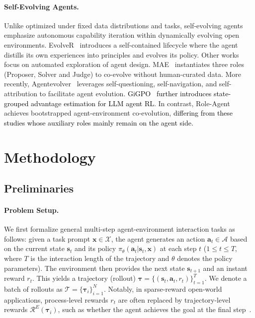 \documentclass[11pt]{article}
\begin{document}
\paragraph{Self-Evolving Agents.} Unlike optimized under fixed data distributions and tasks, self-evolving agents~\cite{gao2025survey,zhai2025agentevolver} emphasize autonomous capability iteration within dynamically evolving open environments. EvolveR~\cite{wu2025evolver} introduces a self-contained lifecycle where the agent distills its own experiences into principles and evolves its policy. Other works~\cite{hu2024automated,novikov2025alphaevolve} focus on automated exploration of agent design. MAE~\cite{chen2025multi} instantiates three roles (Proposer, Solver and Judge) to co-evolve without human-curated data. More recently, Agentevolver~\cite{zhai2025agentevolver} leverages self-questioning, self-navigation, and self-attribution to facilitate agent evolution. \textcolor{black}{GiGPO~\cite{feng2025group} further introduces state-grouped advantage estimation for LLM agent RL.} In contrast, Role-Agent achieves bootstrapped agent-environment co-evolution, \textcolor{black}{differing from these studies whose auxiliary roles mainly remain on the agent side.}

\section{Methodology}

\subsection{Preliminaries}
\paragraph{Problem Setup.} We first formalize general multi-step agent-environment interaction tasks as follows: given a task prompt $\bm{x}\in\mathcal{X}$, the agent generates an action $\bm{a}_t\in{\mathcal{A}}$ based on the current state $\bm{s}_t$ and its policy $\pi_\theta(\bm{a}_t|\bm{s}_t,\bm{x})$ at each step $t$ ($1\le t\le T$, where $T$ is the interaction length of the trajectory and $\theta$ denotes the policy parameters). The environment then provides the next state $\bm{s}_{t+1}$ and an instant reward $r_t$. This yields a trajectory (rollout) $\bm{\tau} = \{(\bm{s}_t,\bm{a}_t,r_t)\}_{t=1}^T$. We denote a batch of rollouts as $\mathcal{T} = \{\bm{\tau}_i\}_{i=1}^N$. Notably, in sparse-reward open-world applications, process-level rewards $r_t$ are often replaced by trajectory-level rewards $\mathcal{R}^E(\bm{\tau}_i)$, such as whether the agent achieves the goal at the final step~\cite{shridhar2020alfworld}. 
\end{document}

